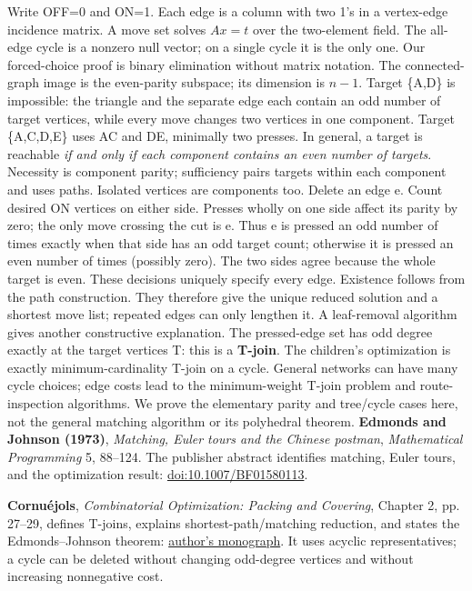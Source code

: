 \documentclass[12pt]{extarticle}
\begin{document}
Write OFF=0 and ON=1. Each edge is a column with two 1's in a vertex-edge incidence matrix. A move set solves \(Ax=t\) over the two-element field. The all-edge cycle is a nonzero null vector; on a single cycle it is the only one. Our forced-choice proof is binary elimination without matrix notation. The connected-graph image is the even-parity subspace; its dimension is \(n-1\).
\newpage
{}
Target \{A,D\} is impossible: the triangle and the separate edge each contain an odd number of target vertices, while every move changes two vertices in one component. Target \{A,C,D,E\} uses AC and DE, minimally two presses. In general, a target is reachable \emph{if and only if each component contains an even number of targets}. Necessity is component parity; sufficiency pairs targets within each component and uses paths. Isolated vertices are components too.
Delete an edge e. Count desired ON vertices on either side. Presses wholly on one side affect its parity by zero; the only move crossing the cut is e. Thus e is pressed an odd number of times exactly when that side has an odd target count; otherwise it is pressed an even number of times (possibly zero). The two sides agree because the whole target is even. These decisions uniquely specify every edge. Existence follows from the path construction. They therefore give the unique reduced solution and a shortest move list; repeated edges can only lengthen it. A leaf-removal algorithm gives another constructive explanation.
The pressed-edge set has odd degree exactly at the target vertices T: this is a \textbf{T-join}. The children's optimization is exactly minimum-cardinality T-join on a cycle. General networks can have many cycle choices; edge costs lead to the minimum-weight T-join problem and route-inspection algorithms. We prove the elementary parity and tree/cycle cases here, not the general matching algorithm or its polyhedral theorem.
\textbf{Edmonds and Johnson (1973)}, \emph{Matching, Euler tours and the Chinese postman}, \emph{Mathematical Programming} 5, 88--124. The publisher abstract identifies matching, Euler tours, and the optimization result: \href{https://doi.org/10.1007/BF01580113}{doi:10.1007/BF01580113}.\par
\textbf{Cornu\'ejols}, \emph{Combinatorial Optimization: Packing and Covering}, Chapter 2, pp. 27--29, defines T-joins, explains shortest-path/matching reduction, and states the Edmonds--Johnson theorem: \href{https://www.sfu.ca/~mdevos/notes/pack-cover/Cornuejols.pdf}{author's monograph}. It uses acyclic representatives; a cycle can be deleted without changing odd-degree vertices and without increasing nonnegative cost.\par
\end{document}
